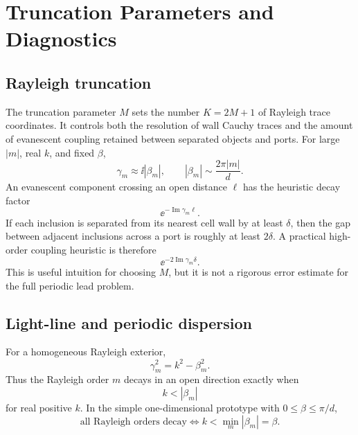 %
%
%
%
%

\section{Truncation Parameters and Diagnostics}

\subsection{Rayleigh truncation}

The truncation parameter \(M\) sets the number \(K=2M+1\) of Rayleigh trace
coordinates.  It controls both the resolution of wall Cauchy traces and the
amount of evanescent coupling retained between separated objects and ports.
For large \(|m|\), real \(k\), and fixed \(\beta\),
\[
  \gamma_m\approx \ii|\beta_m|,
  \qquad
  |\beta_m|\sim\frac{2\pi|m|}{d}.
\]
An evanescent component crossing an open distance \(\ell\) has the heuristic
decay factor
\[
  \ee^{-\operatorname{Im}\gamma_m\ell}.
\]
If each inclusion is separated from its nearest cell wall by at least
\(\delta\), then the gap between adjacent inclusions across a port is roughly at
least \(2\delta\).  A practical high-order coupling heuristic is therefore
\[
  \ee^{-2\operatorname{Im}\gamma_m\delta}.
\]
This is useful intuition for choosing \(M\), but it is not a rigorous error
estimate for the full periodic lead problem.

\subsection{Light-line and periodic dispersion}

For a homogeneous Rayleigh exterior,
\[
  \gamma_m^2=k^2-\beta_m^2 .
\]
Thus the Rayleigh order \(m\) decays in an open direction exactly when
\[
  k<|\beta_m|
\]
for real positive \(k\).  In the simple one-dimensional prototype with
\(0\le\beta\le\pi/d\),
\[
  \text{all Rayleigh orders decay}
  \iff
  k<\min_m|\beta_m|=\beta .
\]

